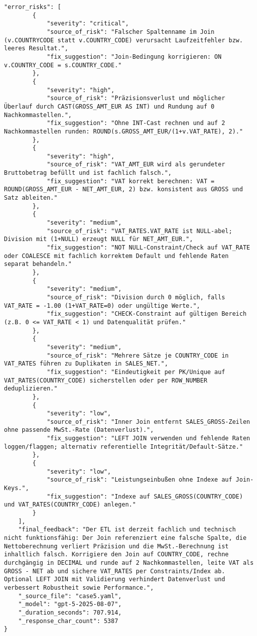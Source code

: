 \begin{lstlisting}[caption={Ausgabe: GPT-5 Anwendungsfall 5 Hauptdurchlauf},label={gpt_case5_prompt1}]
    "error_risks": [
        {
            "severity": "critical",
            "source_of_risk": "Falscher Spaltenname im Join (v.COUNTRYCODE statt v.COUNTRY_CODE) verursacht Laufzeitfehler bzw. leeres Resultat.",
            "fix_suggestion": "Join-Bedingung korrigieren: ON v.COUNTRY_CODE = s.COUNTRY_CODE."
        },
        {
            "severity": "high",
            "source_of_risk": "Präzisionsverlust und möglicher Überlauf durch CAST(GROSS_AMT_EUR AS INT) und Rundung auf 0 Nachkommastellen.",
            "fix_suggestion": "Ohne INT-Cast rechnen und auf 2 Nachkommastellen runden: ROUND(s.GROSS_AMT_EUR/(1+v.VAT_RATE), 2)."
        },
        {
            "severity": "high",
            "source_of_risk": "VAT_AMT_EUR wird als gerundeter Bruttobetrag befüllt und ist fachlich falsch.",
            "fix_suggestion": "VAT korrekt berechnen: VAT = ROUND(GROSS_AMT_EUR - NET_AMT_EUR, 2) bzw. konsistent aus GROSS und Satz ableiten."
        },
        {
            "severity": "medium",
            "source_of_risk": "VAT_RATES.VAT_RATE ist NULL-abel; Division mit (1+NULL) erzeugt NULL für NET_AMT_EUR.",
            "fix_suggestion": "NOT NULL-Constraint/Check auf VAT_RATE oder COALESCE mit fachlich korrektem Default und fehlende Raten separat behandeln."
        },
        {
            "severity": "medium",
            "source_of_risk": "Division durch 0 möglich, falls VAT_RATE = -1.00 (1+VAT_RATE=0) oder ungültige Werte.",
            "fix_suggestion": "CHECK-Constraint auf gültigen Bereich (z.B. 0 <= VAT_RATE < 1) und Datenqualität prüfen."
        },
        {
            "severity": "medium",
            "source_of_risk": "Mehrere Sätze je COUNTRY_CODE in VAT_RATES führen zu Duplikaten in SALES_NET.",
            "fix_suggestion": "Eindeutigkeit per PK/Unique auf VAT_RATES(COUNTRY_CODE) sicherstellen oder per ROW_NUMBER deduplizieren."
        },
        {
            "severity": "low",
            "source_of_risk": "Inner Join entfernt SALES_GROSS-Zeilen ohne passende MwSt.-Rate (Datenverlust).",
            "fix_suggestion": "LEFT JOIN verwenden und fehlende Raten loggen/flaggen; alternativ referentielle Integrität/Default-Sätze."
        },
        {
            "severity": "low",
            "source_of_risk": "Leistungseinbußen ohne Indexe auf Join-Keys.",
            "fix_suggestion": "Indexe auf SALES_GROSS(COUNTRY_CODE) und VAT_RATES(COUNTRY_CODE) anlegen."
        }
    ],
    "final_feedback": "Der ETL ist derzeit fachlich und technisch nicht funktionsfähig: Der Join referenziert eine falsche Spalte, die Nettoberechnung verliert Präzision und die MwSt.-Berechnung ist inhaltlich falsch. Korrigiere den Join auf COUNTRY_CODE, rechne durchgängig in DECIMAL und runde auf 2 Nachkommastellen, leite VAT als GROSS - NET ab und sichere VAT_RATES per Constraints/Index ab. Optional LEFT JOIN mit Validierung verhindert Datenverlust und verbessert Robustheit sowie Performance.",
    "_source_file": "case5.yaml",
    "_model": "gpt-5-2025-08-07",
    "_duration_seconds": 707.914,
    "_response_char_count": 5387
}
\end{lstlisting}

